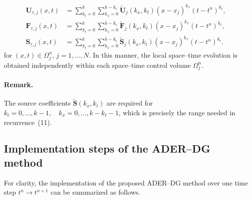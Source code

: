 \documentclass[11pt]{article}
\begin{document}
\begin{align*}
    \mathbf{U}_{\tau,j}(x,t)
    &= \sum_{k_t=0}^{k} \sum_{k_x=0}^{k-k_t}
    \widetilde{\mathbf{U}}_j(k_x,k_t)
    (x-x_j)^{k_x}(t-t^n)^{k_t}, \\
    \mathbf{F}_{\tau,j}(x,t)
    &= \sum_{k_t=0}^{k} \sum_{k_x=0}^{k-k_t}
    \widetilde{\mathbf{F}}_j(k_x,k_t)
    (x-x_j)^{k_x}(t-t^n)^{k_t}, \\
    \mathbf{S}_{\tau,j}(x,t)
    &= \sum_{k_t=0}^{k} \sum_{k_x=0}^{k-k_t}
    \widetilde{\mathbf{S}}_j(k_x,k_t)
    (x-x_j)^{k_x}(t-t^n)^{k_t}.
\end{align*}
for \((x,t)\in\Omega_j^n\), \(j=1,\ldots,N\). In this manner, the local space--time evolution is obtained independently within each space--time control volume \(\Omega_j^n\).
 
\paragraph{Remark.}
The source coefficients \(\widetilde{\mathbf{S}}(k_x,k_t)\) are required  for
\(k_t=0,\ldots,k - 1,\quad k_x=0,\ldots,k-k_t-1\), which is precisely the range needed in recurrence~(11).


\subsection{Implementation steps of the ADER--DG method}

For clarity, the implementation of the proposed ADER--DG method over one
time step \(t^n\longrightarrow t^{n+1}\) can be summarized as follows.
\end{document}

